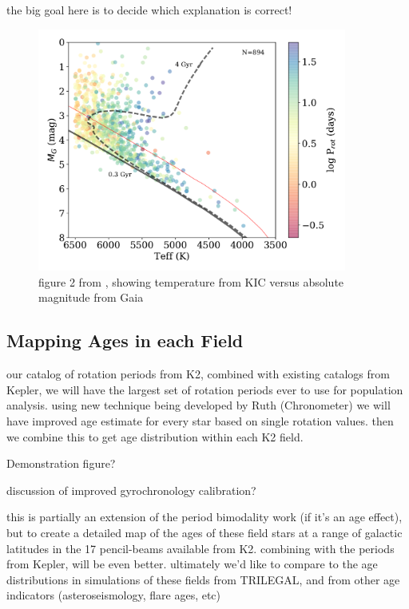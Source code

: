 \documentclass[12pt]{article}
\begin{document}
the big goal here is to decide which explanation is correct!

\begin{figure}[!th]
\centering
\includegraphics[width=4in]{davenport2016_fig2}
\caption{figure 2 from \citet{davenport2017}, showing temperature from KIC versus absolute magnitude from Gaia}
\label{fig:cmd}
\end{figure}




\subsection{Mapping Ages in each Field}
our catalog of rotation periods from K2, combined with existing catalogs from Kepler, we will have the largest set of rotation periods ever to use for population analysis. using new technique being developed by Ruth (Chronometer) we will have improved age estimate for every star based on single rotation values. then we combine this to get age distribution within each K2 field.

Demonstration figure?

discussion of improved gyrochronology calibration?

this is partially an extension of the period bimodality work (if it's an age effect), but to create a detailed map of the ages of these field stars at a range of galactic latitudes in the 17 pencil-beams available from K2. combining with the periods from Kepler, will be even better. ultimately we'd like to compare to the age distributions in simulations of these fields from TRILEGAL, and from other age indicators (asteroseismology, flare ages, etc)



\end{document}
